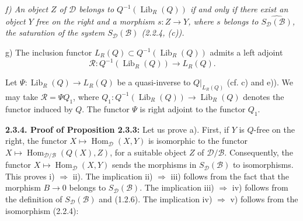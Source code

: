 \clearpage
{}%
\begingroup
\small
\setlength{\parskip}{0pt}%
\setlength{\emergencystretch}{1.5em}%
\setlength{\abovedisplayskip}{3pt plus 1pt minus 1pt}%
\setlength{\belowdisplayskip}{3pt plus 1pt minus 1pt}%

\begingroup\itshape
{}
\noindent f) An object $Z$ of $\mathcal D$ belongs to
$Q^{-1}(\operatorname{Lib}_R(Q))$ if and only if there exist an object $Y$
free on the right and a morphism $s\colon Z\longrightarrow Y$, where $s$
belongs to $\widehat{S_{\mathcal D}(\mathcal B)}$, the saturation of the
system $S_{\mathcal D}(\mathcal B)$ (2.2.4, (c)).

\par\noindent g) The inclusion functor
$L_R(Q)\subset Q^{-1}(\operatorname{Lib}_R(Q))$ admits a left adjoint
\[
  \mathcal R\colon Q^{-1}(\operatorname{Lib}_R(Q))\longrightarrow L_R(Q).
\]

\begin{center}
\end{center}
\endgroup

Let $\Psi\colon\operatorname{Lib}_R(Q)\longrightarrow L_R(Q)$ be a
quasi-inverse to $Q|_{L_R(Q)}$ (cf. c) and e)). We may take
$\mathcal R=\Psi Q_1$, where
$Q_1\colon Q^{-1}(\operatorname{Lib}_R(Q))\longrightarrow
\operatorname{Lib}_R(Q)$ denotes the functor induced by $Q$. The functor
$\Psi$ is right adjoint to the functor $Q_1$.

\medskip
\noindent\textbf{2.3.4. Proof of Proposition 2.3.3:}\quad
{}
Let us prove a). First, if $Y$ is $Q$-free on the right, the functor
$X\longmapsto\operatorname{Hom}_{\mathcal D}(X,Y)$ is isomorphic to the
functor
$X\longmapsto\operatorname{Hom}_{\mathcal D/\mathcal B}(Q(X),Z)$, for a
suitable object $Z$ of $\mathcal D/\mathcal B$. Consequently, the functor
$X\longmapsto\operatorname{Hom}_{\mathcal D}(X,Y)$ sends the morphisms in
$S_{\mathcal D}(\mathcal B)$ to isomorphisms. This proves i)
$\Rightarrow$ ii). The implication ii) $\Rightarrow$ iii) follows from the
fact that the morphism $B\longrightarrow0$ belongs to
$S_{\mathcal D}(\mathcal B)$. The implication iii) $\Rightarrow$ iv)
follows from the definition of $S_{\mathcal D}(\mathcal B)$ and (1.2.6).
The implication iv) $\Rightarrow$ v) follows from the isomorphism (2.2.4):

